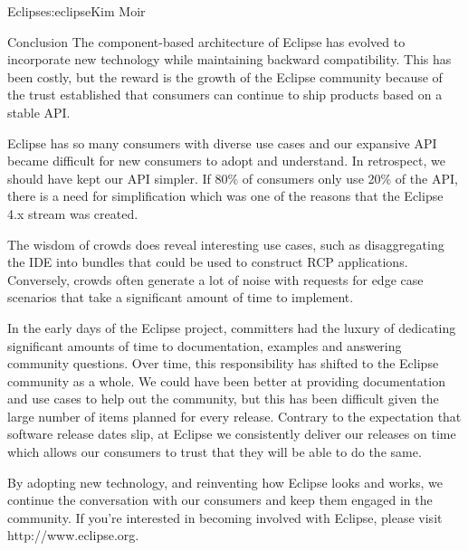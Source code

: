 \begin{aosachapter}{Eclipse}{s:eclipse}{Kim Moir}
\begin{aosasect1}{Conclusion}
The component-based architecture of Eclipse has evolved to incorporate
new technology while maintaining backward compatibility.  This has
been costly, but the reward is the growth of the Eclipse community
because of the trust established that consumers can continue to ship
products based on a stable API.

Eclipse has so many consumers with diverse use cases and our expansive
API became difficult for new consumers to adopt and understand. In
retrospect, we should have kept our API simpler. If 80\% of consumers
only use 20\% of the API, there is a need for simplification which was
one of the reasons that the Eclipse 4.x stream was created.

The wisdom of crowds does reveal interesting use cases, such as
disaggregating the IDE into bundles that could be used to construct
RCP applications.  Conversely, crowds often generate a lot of noise
with requests for edge case scenarios that take a significant amount
of time to implement.

In the early days of the Eclipse project, committers had the luxury of
dedicating significant amounts of time to documentation, examples and
answering community questions. Over time, this responsibility has
shifted to the Eclipse community as a whole.  We could have been
better at providing documentation and use cases to help out the
community, but this has been difficult given the large number of items
planned for every release.  Contrary to the expectation that software
release dates slip, at Eclipse we consistently deliver our releases on
time which allows our consumers to trust that they will be able to do
the same.

By adopting new technology, and reinventing how Eclipse looks and
works, we continue the conversation with our consumers and keep
them engaged in the community. If you're interested in becoming
involved with Eclipse, please visit http://www.eclipse.org.
\end{aosasect1}

\end{aosachapter}
